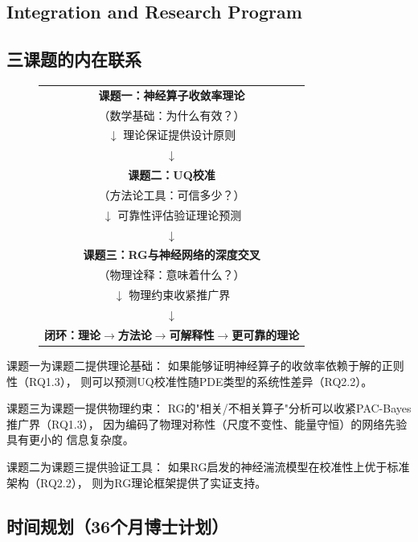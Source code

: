 \documentclass[12pt,a4paper,twoside]{article}
\begin{document}
\begin{inversation}
\section*{Integration and Research Program}
\label{sec:integration}

\subsection{三课题的内在联系}

\begin{figure}[h]
    \centering
    \begin{tabular}{c}
        \textbf{课题一：神经算子收敛率理论} \\
        （数学基础：为什么有效？） \\
        $\downarrow$ 理论保证提供设计原则 \\
        $\downarrow$ \\
        \textbf{课题二：UQ校准} \\
        （方法论工具：可信多少？） \\
        $\downarrow$ 可靠性评估验证理论预测 \\
        $\downarrow$ \\
        \textbf{课题三：RG与神经网络的深度交叉} \\
        （物理诠释：意味着什么？） \\
        $\downarrow$ 物理约束收紧推广界 \\
        $\downarrow$ \\
        \textbf{闭环：理论$\to$方法论$\to$可解释性$\to$更可靠的理论}
    \end{tabular}
\end{figure}

课题一为课题二提供理论基础：
如果能够证明神经算子的收敛率依赖于解的正则性（RQ1.3），
则可以预测UQ校准性随PDE类型的系统性差异（RQ2.2）。

课题三为课题一提供物理约束：
RG的"相关/不相关算子"分析可以收紧PAC-Bayes推广界（RQ1.3），
因为编码了物理对称性（尺度不变性、能量守恒）的网络先验具有更小的
信息复杂度。

课题二为课题三提供验证工具：
如果RG启发的神经湍流模型在校准性上优于标准架构（RQ2.2），
则为RG理论框架提供了实证支持。

\subsection{时间规划（36个月博士计划）}


\end{inversation}
\end{document}
